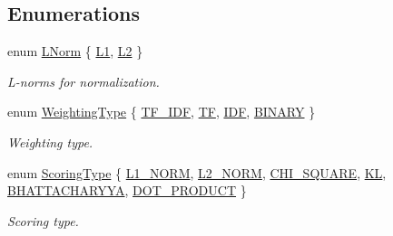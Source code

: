 \subsection*{Enumerations}
\begin{DoxyCompactItemize}
\item 
enum \mbox{\hyperlink{namespace_d_bo_w2_a53e9e0bcfc25c861815e413a7cf3fa51}{L\+Norm}} \{ \mbox{\hyperlink{namespace_d_bo_w2_a53e9e0bcfc25c861815e413a7cf3fa51a94f5879ff083c0a8364805ae4f9c2d5c}{L1}}, 
\mbox{\hyperlink{namespace_d_bo_w2_a53e9e0bcfc25c861815e413a7cf3fa51aff96c9503798aa8504a954d3832e5eaa}{L2}}
 \}
\begin{DoxyCompactList}\small\item\em L-\/norms for normalization. \end{DoxyCompactList}\item 
enum \mbox{\hyperlink{namespace_d_bo_w2_a5de5c8a307aca9a84ffefda2a9bc467a}{Weighting\+Type}} \{ \mbox{\hyperlink{namespace_d_bo_w2_a5de5c8a307aca9a84ffefda2a9bc467aaa3425e88466862008dff6883e07e205d}{T\+F\+\_\+\+I\+DF}}, 
\mbox{\hyperlink{namespace_d_bo_w2_a5de5c8a307aca9a84ffefda2a9bc467aa15d1950b5707de9ac0760c2c6dae48bd}{TF}}, 
\mbox{\hyperlink{namespace_d_bo_w2_a5de5c8a307aca9a84ffefda2a9bc467aa5a1c1f7cd866c8bea4551e296298c3bc}{I\+DF}}, 
\mbox{\hyperlink{namespace_d_bo_w2_a5de5c8a307aca9a84ffefda2a9bc467aae517632073c3a0b980558ebb6519d759}{B\+I\+N\+A\+RY}}
 \}
\begin{DoxyCompactList}\small\item\em Weighting type. \end{DoxyCompactList}\item 
enum \mbox{\hyperlink{namespace_d_bo_w2_aa252a592dd607c6e60dede06ceef2722}{Scoring\+Type}} \{ \newline
\mbox{\hyperlink{namespace_d_bo_w2_aa252a592dd607c6e60dede06ceef2722a2df432e58efd2a13d4950ee96aa6a20f}{L1\+\_\+\+N\+O\+RM}}, 
\mbox{\hyperlink{namespace_d_bo_w2_aa252a592dd607c6e60dede06ceef2722ad1a4e066e848e5247e4d94dd3e08f509}{L2\+\_\+\+N\+O\+RM}}, 
\mbox{\hyperlink{namespace_d_bo_w2_aa252a592dd607c6e60dede06ceef2722ad0bd4548b18fb1c165961506e199f38d}{C\+H\+I\+\_\+\+S\+Q\+U\+A\+RE}}, 
\mbox{\hyperlink{namespace_d_bo_w2_aa252a592dd607c6e60dede06ceef2722a607c4948ab28605098d7cedb9bce14ae}{KL}}, 
\newline
\mbox{\hyperlink{namespace_d_bo_w2_aa252a592dd607c6e60dede06ceef2722a22de570628b33a2662630def802a23cb}{B\+H\+A\+T\+T\+A\+C\+H\+A\+R\+Y\+YA}}, 
\mbox{\hyperlink{namespace_d_bo_w2_aa252a592dd607c6e60dede06ceef2722a14556ffa1d80b1c7540ea68506eb5b56}{D\+O\+T\+\_\+\+P\+R\+O\+D\+U\+CT}}
 \}
\begin{DoxyCompactList}\small\item\em Scoring type. \end{DoxyCompactList}\end{DoxyCompactItemize}
